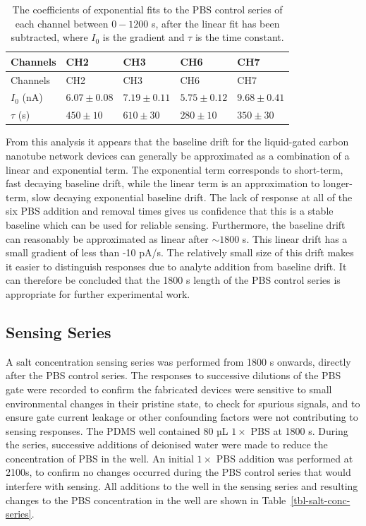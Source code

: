 \documentclass[
  a4paper,
]{scrbook}
\begin{document}
\hypertarget{tbl-exp-fits}{}
\begin{longtable}[]{@{}lllll@{}}
\caption{\label{tbl-exp-fits}The coefficients of exponential fits to the
PBS control series of each channel between \(0-1200\) s, after the
linear fit has been subtracted, where \(I_0\) is the gradient and
\(\tau\) is the time constant.\\
}\tabularnewline
\toprule\noalign{}
Channels & CH2 & CH3 & CH6 & CH7 \\
\midrule\noalign{}
\endfirsthead
\toprule\noalign{}
Channels & CH2 & CH3 & CH6 & CH7 \\
\midrule\noalign{}
\endhead
\bottomrule\noalign{}
\endlastfoot
\(I_0\) (nA) & \(6.07\pm0.08\) & \(7.19\pm0.11\) & \(5.75\pm0.12\) &
\(9.68\pm0.41\) \\
\(\tau\) (s) & \(450\pm10\) & \(610\pm30\) & \(280\pm10\) &
\(350\pm30\) \\
\end{longtable}

From this analysis it appears that the baseline drift for the
liquid-gated carbon nanotube network devices can generally be
approximated as a combination of a linear and exponential term. The
exponential term corresponds to short-term, fast decaying baseline
drift, while the linear term is an approximation to longer-term, slow
decaying exponential baseline drift. The lack of response at all of the
six PBS addition and removal times gives us confidence that this is a
stable baseline which can be used for reliable sensing. Furthermore, the
baseline drift can reasonably be approximated as linear after
\(\sim 1800\) s. This linear drift has a small gradient of less than -10
pA/s. The relatively small size of this drift makes it easier to
distinguish responses due to analyte addition from baseline drift. It
can therefore be concluded that the 1800 s length of the PBS control
series is appropriate for further experimental work.

\hypertarget{sec-salt-conc-series}{%
\subsection{Sensing Series}\label{sec-salt-conc-series}}

A salt concentration sensing series was performed from 1800 s onwards,
directly after the PBS control series. The responses to successive
dilutions of the PBS gate were recorded to confirm the fabricated
devices were sensitive to small environmental changes in their pristine
state, to check for spurious signals, and to ensure gate current leakage
or other confounding factors were not contributing to sensing responses.
The PDMS well contained 80 µL \(1 \times\) PBS at 1800 s. During the
series, successive additions of deionised water were made to reduce the
concentration of PBS in the well. An initial \(1 \times\) PBS addition
was performed at 2100s, to confirm no changes occurred during the PBS
control series that would interfere with sensing. All additions to the
well in the sensing series and resulting changes to the PBS
concentration in the well are shown in Table~\ref{tbl-salt-conc-series}.
\end{document}
